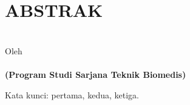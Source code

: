 \clearpage
\chapter*{ABSTRAK}

\begin{center}
	
	\renewcommand{\baselinestretch}{1}
	\large{\bfseries \MakeUppercase{\thetitle}}
	\\[\baselineskip]
	
	\normalsize{Oleh\\}
	\large{ 
		\bfseries \theauthor\\
		(Program Studi Sarjana Teknik Biomedis)
	}
	\\[2\baselineskip]
	
\end{center}

\blindtext

Kata kunci: pertama, kedua, ketiga.

\clearpage